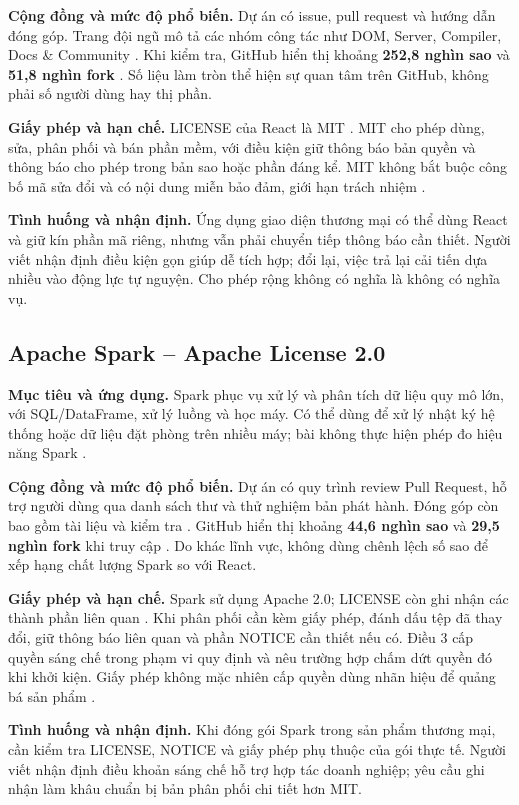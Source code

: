 \documentclass[12pt,a4paper]{article}
\begin{document}
\textbf{Cộng đồng và mức độ phổ biến.} Dự án có issue, pull request và hướng dẫn đóng góp. Trang đội ngũ mô tả các nhóm công tác như DOM, Server, Compiler, Docs \& Community \cite{reactteam}. Khi kiểm tra, GitHub hiển thị khoảng \textbf{252,8 nghìn sao} và \textbf{51,8 nghìn fork} \cite{react}. Số liệu làm tròn thể hiện sự quan tâm trên GitHub, không phải số người dùng hay thị phần.

\textbf{Giấy phép và hạn chế.} LICENSE của React là MIT \cite{reactlicense}. MIT cho phép dùng, sửa, phân phối và bán phần mềm, với điều kiện giữ thông báo bản quyền và thông báo cho phép trong bản sao hoặc phần đáng kể. MIT không bắt buộc công bố mã sửa đổi và có nội dung miễn bảo đảm, giới hạn trách nhiệm \cite{mit}.

\textbf{Tình huống và nhận định.} Ứng dụng giao diện thương mại có thể dùng React và giữ kín phần mã riêng, nhưng vẫn phải chuyển tiếp thông báo cần thiết. Người viết nhận định điều kiện gọn giúp dễ tích hợp; đổi lại, việc trả lại cải tiến dựa nhiều vào động lực tự nguyện. Cho phép rộng không có nghĩa là không có nghĩa vụ.

\subsection{Apache Spark -- Apache License 2.0}
\textbf{Mục tiêu và ứng dụng.} Spark phục vụ xử lý và phân tích dữ liệu quy mô lớn, với SQL/DataFrame, xử lý luồng và học máy. Có thể dùng để xử lý nhật ký hệ thống hoặc dữ liệu đặt phòng trên nhiều máy; bài không thực hiện phép đo hiệu năng Spark \cite{spark}.

\textbf{Cộng đồng và mức độ phổ biến.} Dự án có quy trình review Pull Request, hỗ trợ người dùng qua danh sách thư và thử nghiệm bản phát hành. Đóng góp còn bao gồm tài liệu và kiểm tra \cite{sparkcontrib}. GitHub hiển thị khoảng \textbf{44,6 nghìn sao} và \textbf{29,5 nghìn fork} khi truy cập \cite{spark}. Do khác lĩnh vực, không dùng chênh lệch số sao để xếp hạng chất lượng Spark so với React.

\textbf{Giấy phép và hạn chế.} Spark sử dụng Apache 2.0; LICENSE còn ghi nhận các thành phần liên quan \cite{sparklicense}. Khi phân phối cần kèm giấy phép, đánh dấu tệp đã thay đổi, giữ thông báo liên quan và phần NOTICE cần thiết nếu có. Điều 3 cấp quyền sáng chế trong phạm vi quy định và nêu trường hợp chấm dứt quyền đó khi khởi kiện. Giấy phép không mặc nhiên cấp quyền dùng nhãn hiệu để quảng bá sản phẩm \cite{apache}.

\textbf{Tình huống và nhận định.} Khi đóng gói Spark trong sản phẩm thương mại, cần kiểm tra LICENSE, NOTICE và giấy phép phụ thuộc của gói thực tế. Người viết nhận định điều khoản sáng chế hỗ trợ hợp tác doanh nghiệp; yêu cầu ghi nhận làm khâu chuẩn bị bản phân phối chi tiết hơn MIT.
\end{document}
